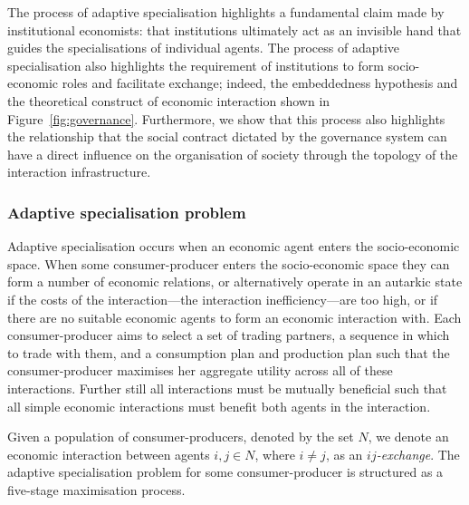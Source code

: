 The process of adaptive specialisation highlights a fundamental claim made by institutional economists: that institutions ultimately act as an invisible hand that guides the specialisations of individual agents. The process of adaptive specialisation also highlights the requirement of institutions to form socio-economic roles and facilitate exchange; indeed, the embeddedness hypothesis and the theoretical construct of economic interaction shown in Figure~\ref{fig:governance}. Furthermore, we show that this process also highlights the relationship that the social contract dictated by the governance system can have a direct influence on the organisation of society through the topology of the interaction infrastructure.

\subsubsection{Adaptive specialisation problem}

Adaptive specialisation occurs when an economic agent enters the socio-economic space. When some consumer-producer enters the socio-economic space they can form a number of economic relations, or alternatively operate in an autarkic state if the costs of the interaction---the interaction inefficiency---are too high, or if there are no suitable economic agents to form an economic interaction with. Each consumer-producer aims to select a set of trading partners, a sequence in which to trade with them, and a consumption plan and production plan such that the consumer-producer maximises her aggregate utility across all of these interactions. Further still all interactions must be mutually beneficial such that all simple economic interactions must benefit both agents in the interaction. 

Given a population of consumer-producers, denoted by the set $N$, we denote an economic interaction between agents $i,j \in N$, where $i \neq j$, as an $ij$\emph{-exchange}. The adaptive specialisation problem for some consumer-producer is structured as a five-stage maximisation process. 

